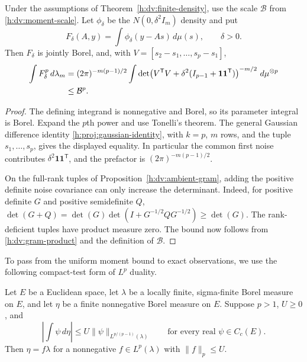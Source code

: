 \begin{lemma}
\label{h:dv:gaussian-moment}
Under the assumptions of Theorem~\ref{h:dv:finite-density}, use
the scale \(\mathcal B\) from \eqref{h:dv:moment-scale}.
Let \(\phi_\delta\) be the \(N(0,\delta^2I_m)\) density and put
\[
 F_\delta(A,y)=\int\phi_\delta(y-As)\,d\mu(s),
 \qquad \delta>0.
\]
Then \(F_\delta\) is jointly Borel, and, with
\(V=[s_2-s_1,\ldots,s_p-s_1]\),
\begin{align}
 \int F_\delta^p\,d\lambda_m
 &=(2\pi)^{-m(p-1)/2}
   \int\det\!\left(
     V^{\mathsf T}V+
     \delta^2(I_{p-1}+\mathbf 1\mathbf 1^{\mathsf T})
   \right)^{-m/2}\,d\mu^{\otimes p}
 \notag\\
 &\le \mathcal B^p.
 \label{h:dv:gaussian-moment-bound}
\end{align}
\end{lemma}

\begin{proof}
The defining integrand is nonnegative and Borel, so its parameter
integral is Borel.  Expand the \(p\)th power and use Tonelli's theorem.
The general Gaussian difference identity
\eqref{h:proj:gaussian-identity}, with \(k=p\), \(m\) rows, and the
tuple \(s_1,\ldots,s_p\), gives the displayed equality.  In particular
the common first noise contributes
\(\delta^2\mathbf1\mathbf1^{\mathsf T}\), and the prefactor is
\((2\pi)^{-m(p-1)/2}\).

On the full-rank tuples of Proposition~\ref{h:dv:ambient-gram},
adding the positive definite noise covariance can only increase the
determinant.  Indeed, for positive definite \(G\) and positive
semidefinite \(Q\),
\(\det(G+Q)=\det(G)\det(I+G^{-1/2}QG^{-1/2})\ge\det(G)\).
The rank-deficient tuples have product measure zero.  The bound now
follows from \eqref{h:dv:gram-product} and the definition of
\(\mathcal B\).
\end{proof}

To pass from the uniform moment bound to exact observations, we use
the following compact-test form of \(L^p\) duality.

\begin{lemma}
\label{h:proj:density-by-tests}
Let \(E\) be a Euclidean space, let \(\lambda\) be a locally finite,
sigma-finite Borel measure on \(E\), and let \(\eta\) be a finite
nonnegative Borel measure on \(E\). Suppose \(p>1\), \(U\ge0\), and
\[
 \left|\int\psi\,d\eta\right|
 \le U\|\psi\|_{L^{p/(p-1)}(\lambda)}
 \qquad\text{for every real }\psi\in C_c(E).
\]
Then \(\eta=f\lambda\) for a nonnegative
\(f\in L^p(\lambda)\) with \(\|f\|_p\le U\).
\end{lemma}

